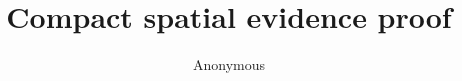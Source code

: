 \documentclass{article}
\title{Compact spatial evidence proof}
\author{Anonymous}
\begin{document}
\label{tab:editorial-spatial}

\end{document}
